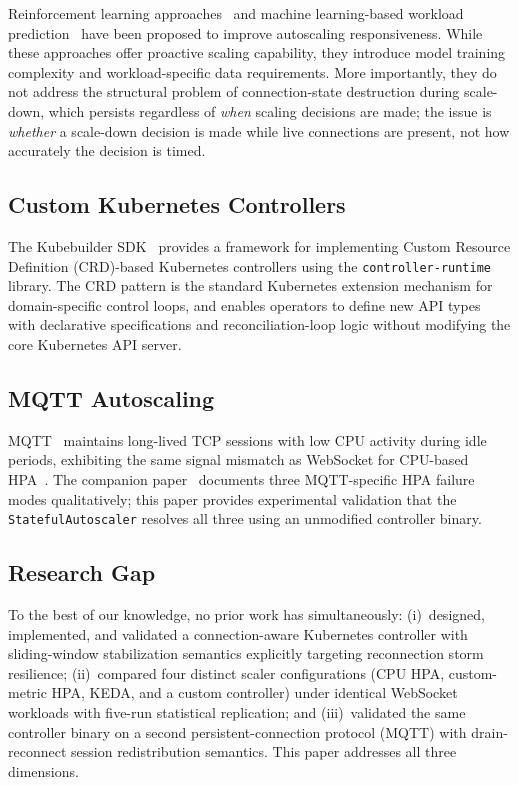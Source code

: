 \documentclass[twocolumn]{svjour3}
\begin{document}
Reinforcement learning approaches~\cite{rossi2020horizontal,imdoukh2020machine} and
machine learning-based workload prediction~\cite{toka2021machine,zhong2020machine} have
been proposed to improve autoscaling responsiveness. While these approaches offer proactive
scaling capability, they introduce model training complexity and workload-specific data
requirements. More importantly, they do not address the structural problem of
connection-state destruction during scale-down, which persists regardless of \textit{when}
scaling decisions are made; the issue is \textit{whether} a scale-down decision is made while
live connections are present, not how accurately the decision is timed.

\subsection{Custom Kubernetes Controllers}

The Kubebuilder SDK~\cite{kubebuilder_docs} provides a framework for implementing
Custom Resource Definition (CRD)-based Kubernetes controllers using the
\texttt{controller-runtime} library. The CRD pattern is the standard Kubernetes extension
mechanism for domain-specific control loops, and enables operators to define new API types
with declarative specifications and reconciliation-loop logic without modifying the core
Kubernetes API server.

\subsection{MQTT Autoscaling}

MQTT~\cite{mqtt_v31} maintains long-lived TCP sessions with low CPU activity during idle
periods, exhibiting the same signal mismatch as WebSocket for CPU-based HPA~\cite{soni2017mqtt}.
The companion paper~\cite{behera2026hpa} documents three MQTT-specific HPA failure modes
qualitatively; this paper provides experimental validation that the \texttt{StatefulAutoscaler}
resolves all three using an unmodified controller binary.

\subsection{Research Gap}

To the best of our knowledge, no prior work has simultaneously: (i)~designed, implemented,
and validated a connection-aware Kubernetes controller with sliding-window stabilization
semantics explicitly targeting reconnection storm resilience; (ii)~compared four distinct scaler
configurations (CPU HPA, custom-metric HPA, KEDA, and a custom controller) under
identical WebSocket workloads with five-run statistical replication; and (iii)~validated the same
controller binary on a second persistent-connection protocol (MQTT) with drain-reconnect
session redistribution semantics. This paper addresses all three dimensions.
\end{document}
